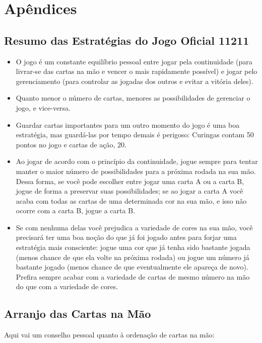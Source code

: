 \section{Apêndices}

\appendix

\subsection{Resumo das Estratégias do Jogo Oficial 11211}

\begin{itemize}
\item{O jogo é um constante equilíbrio pessoal entre jogar pela continuidade (para livrar-se das cartas na mão e vencer o mais rapidamente possível) e jogar pelo gerenciamento (para controlar as jogadas dos outros e evitar a vitória deles).}
\item{Quanto menor o número de cartas, menores as possibilidades de gerenciar o jogo, e vice-versa.}
\item{Guardar cartas importantes para um outro momento do jogo é uma boa estratégia, mas guardá-las por tempo demais é perigoso: Curingas contam 50 pontos no jogo e cartas de ação, 20.}
\item{Ao jogar de acordo com o princípio da continuidade, jogue sempre para tentar manter o maior número de possibilidades para a próxima rodada na sua mão. Dessa forma, se você pode escolher entre jogar uma carta A ou a carta B, jogue de forma a preservar suas possibilidades; se ao jogar a carta A você acaba com todas as cartas de uma determinada cor na sua mão, e isso não ocorre com a carta B, jogue a carta B.}
\item{Se com nenhuma delas você prejudica a variedade de cores na sua mão, você precisará ter uma boa noção do que já foi jogado antes para forjar uma estratégia mais consciente: jogue uma cor que já tenha sido bastante jogada (menos chance de que ela volte na próxima rodada) ou jogue um número já bastante jogado (menos chance de que eventualmente ele apareça de novo). Prefira sempre acabar com a variedade de cartas de mesmo número na mão do que com a variedade de cores.}
\end{itemize}

\subsection{Arranjo das Cartas na Mão}

Aqui vai um conselho pessoal quanto à ordenação de cartas na mão:

